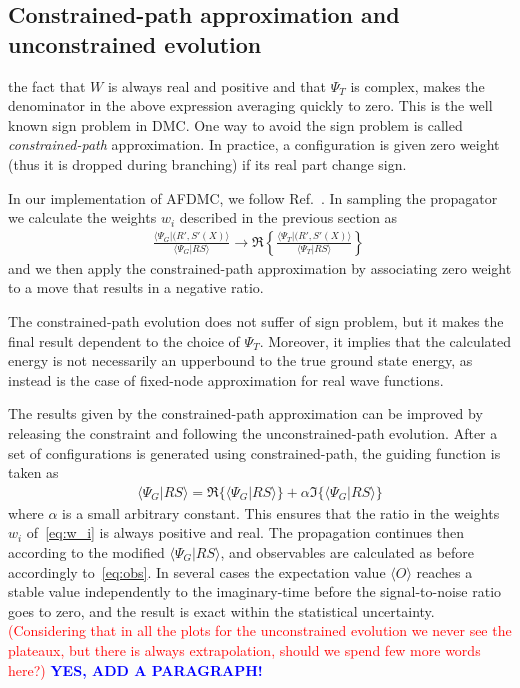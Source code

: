 \documentclass[aps,prc,twocolumn,superscriptaddress,showpacs,floatfix,nofootinbib]{revtex4-1}
\newcommand{\red}[1]{\protect\textcolor{red}{#1}}
\newcommand{\blue}[1]{\protect\textcolor{blue}{#1}}
\begin{document}
\subsection{Constrained-path approximation and unconstrained evolution}
\label{sec:cp}
the fact that $W$ is always real and positive and that $\Psi_T$ is complex, makes the denominator in the 
above expression averaging quickly to zero. This is the well known sign problem in DMC.
One way to avoid the sign problem is called \emph{constrained-path} approximation. In practice,
a configuration is given zero weight (thus it is dropped during branching) 
if its real part change sign.

In our implementation of AFDMC, we follow Ref.~\cite{Zhang:2003}. 
In sampling the propagator we calculate the weights $w_i$ described in the previous section as
\begin{align}
\frac{\langle\Psi_G|(R',S'(X)\rangle}{\langle\Psi_G|RS\rangle}\rightarrow
\Re\left\{\frac{\langle\Psi_T|(R',S'(X)\rangle}{\langle\Psi_T|RS\rangle}\right\}\,
\end{align}
and we then apply the constrained-path approximation by associating zero weight to a move
that results in a negative ratio.

The constrained-path evolution does not suffer of sign problem, but it makes the final result
dependent to the choice of $\Psi_T$. Moreover, it implies that the calculated energy is not necessarily
an upperbound to the true ground state energy, as instead is the case of fixed-node approximation 
for real wave functions.

The results given by the constrained-path approximation can be improved by releasing the 
constraint and following the unconstrained-path evolution.
After a set of configurations is generated using constrained-path, the guiding function
is taken as
\begin{align}
\langle\Psi_G|RS\rangle=\Re\{\langle\Psi_G|RS\rangle\}+\alpha\Im\{\langle\Psi_G|RS\rangle\}
\end{align}
where $\alpha$ is a small arbitrary constant.
This ensures that the ratio in the weights $w_i$ of~\cref{eq:w_i} is always positive and real.
The propagation continues then according to the modified $\langle\Psi_G|RS\rangle$, and 
observables are calculated as before accordingly to~\cref{eq:obs}.
In several cases the expectation value $\langle O\rangle$ reaches a stable value independently
to the imaginary-time before the signal-to-noise ratio goes to zero, and the result is exact 
within the statistical uncertainty.
\red{(Considering that in all the plots for the unconstrained evolution we never see the
plateaux, but there is always extrapolation, should we spend few more words here?)}
\blue{\bf YES, ADD A PARAGRAPH!}
\end{document}
